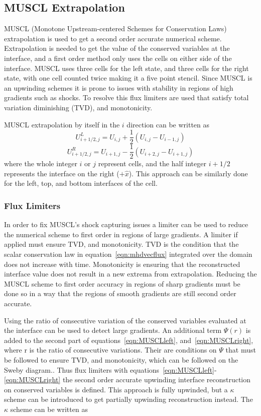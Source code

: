 \documentclass[]{aiaa-tc}%
\begin{document}
\subsection{MUSCL Extrapolation}\label{sec:nummod:MUSCL}
MUSCL (Monotone Upstream-centered Schemes for Conservation Laws) extrapolation is used to get a second order accurate numerical scheme. Extrapolation is needed to get the value of the conserved variables at the interface, and a first order method only uses the cells on either side of the interface. MUSCL uses three cells for the left state, and three cells for the right state, with one cell counted twice making it a five point stencil. Since MUSCL is an upwinding schemes it is prone to issues with stability in regions of high gradients such as shocks. To resolve this flux limiters are used that satisfy total variation diminishing (TVD), and monotonicity.

MUSCL extrapolation by itself in the $i$ direction can be written as
\begin{equation}\label{eqn:MUSCLleft}
  U_{i+1/2, j}^L = U_{i,j} + \frac{1}{2}\left(U_{i,j} - U_{i-1, j}\right)
\end{equation}
\begin{equation}\label{eqn:MUSCLright}
  U_{i+1/2, j}^R = U_{i+1, j} - \frac{1}{2}\left(U_{i+2, j} - U_{i+1, j}\right)
\end{equation}
where the whole integer $i$ or $j$ represent cells, and the half integer $i+1/2$ represents the interface on the right ($+\hat{x}$). This approach can be similarly done for the left, top, and bottom interfaces of the cell.

\subsubsection{Flux Limiters}\label{sec:nummod:fluxlimit}
In order to fix MUSCL's shock capturing issues a limiter can be used to reduce the numerical scheme to first order in regions of large gradients. A limiter if applied must ensure TVD, and monotonicity. TVD is the condition that the scalar conservation law in equation~\ref{eqn:mhdvecflux} integrated over the domain does not increase with time. Monotonicity is ensuring that the reconstructed interface value does not result in a new extrema from extrapolation. Reducing the MUSCL scheme to first order accuracy in regions of sharp gradients must be done so in a way that the regions of smooth gradients are still second order accurate.

Using the ratio of consecutive variation of the conserved variables evaluated at the interface can be used to detect large gradients. An additional term $\Psi(r)$ is added to the second part of equations~\ref{eqn:MUSCLleft}, and~\ref{eqn:MUSCLright}, where r is the ratio of consecutive variations. Their are conditions on $\Psi$ that must be followed to ensure TVD, and monotonicity, which can be followed on the Sweby diagram.\cite{leveque2002}. Thus flux limiters with equations~\ref{eqn:MUSCLleft}-\ref{eqn:MUSCLright} the second order accurate upwinding interface reconstruction on conserved variables is defined. This approach is fully upwinded, but a $\kappa$ scheme can be introduced to get partially upwinding reconstruction instead. The $\kappa$ scheme can be written as
\end{document}
